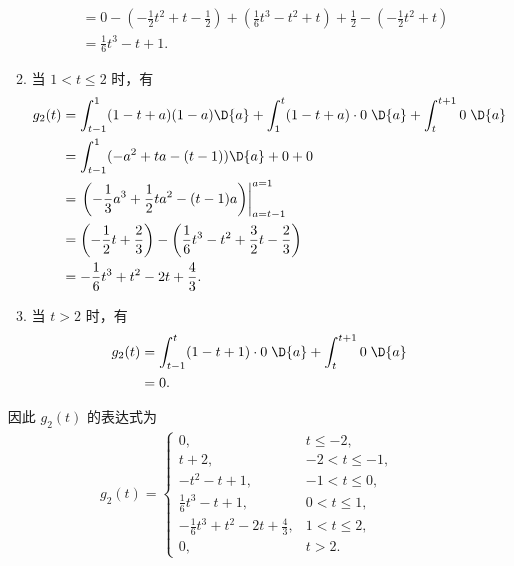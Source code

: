 \begin{solution}
\begin{enumerate}[label=(\arabic*)]
\begin{enumerate}
\begin{align*}
                        & = 0 - \left(-\frac{1}{2}t^2 + t - \frac{1}{2}\right) + \left(\frac{1}{6}t^3 - t^2 + t\right) + \frac{1}{2} - \left(-\frac{1}{2}t^2 + t\right) \\
                        & = \frac{1}{6}t^3 - t + 1.
                    \end{align*}
                \item 当 $1 < t \le 2$ 时，有
                    \begin{align*}
                        g_2(t) & = \int_{t - 1}^{1}(1 - t + a)(1 - a)\D{a} + \int_{1}^{t}(1 - t + a)\cdot 0\;\D{a} + \int_{t}^{t + 1}0\;\D{a} \\
                        & = \int_{t - 1}^{1}(-a^2 + ta - (t - 1))\D{a} + 0 + 0 \\
                        & = \left.\left(-\frac{1}{3}a^3 + \frac{1}{2}ta^2 - (t - 1)a\right)\right|_{a = t - 1}^{a = 1} \\
                        & = \left(-\frac{1}{2}t + \frac{2}{3}\right) - \left(\frac{1}{6}t^3 - t^2 + \frac{3}{2}t - \frac{2}{3}\right) \\
                        & = -\frac{1}{6}t^3 + t^2 - 2t + \frac{4}{3}.
                    \end{align*}
                \item 当 $t > 2$ 时，有
                    \begin{align*}
                        g_2(t) & = \int_{t - 1}^{t}(1 - t + 1) \cdot 0\;\D{a} + \int_{t}^{t + 1}0\;\D{a} \\
                        & = 0.
                    \end{align*}
            \end{enumerate}

            因此 $g_2(t)$ 的表达式为
            \begin{align*}
                g_2(t) = \begin{cases}
                    0, & t \le -2, \\
                    t + 2, & -2 < t \le -1, \\
                    -t^2 - t + 1, & -1 < t \le 0, \\
                    \frac{1}{6}t^3 - t + 1, & 0 < t \le 1, \\
                    -\frac{1}{6}t^3 + t^2 - 2t + \frac{4}{3}, & 1 < t \le 2, \\
                    0, & t > 2.
                \end{cases}
            \end{align*}


\end{enumerate}
\end{solution}
